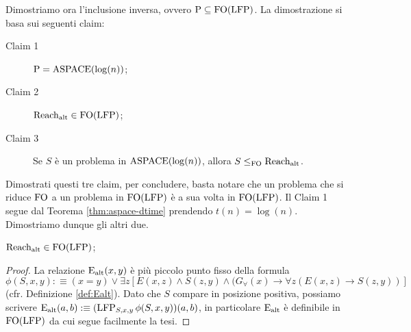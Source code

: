 Dimostriamo ora l'inclusione inversa, ovvero $\operatorname{P} \subseteq \operatorname{FO}(\operatorname{LFP})$. La
dimostrazione si basa sui seguenti claim:
\begin{description}
 \item[Claim 1]\label{p_eq_a} $\operatorname{P} = \operatorname{ASPACE}(\log(n))$;
 \item[Claim 2]\label{ralt_in_p} $\operatorname{Reach_{alt}} \in \operatorname{FO}(\operatorname{LFP})$;
 \item[Claim 3]\label{reduct_fo} Se $S$ è un problema in $\operatorname{ASPACE}(\log(n))$, allora $S \leq_{\operatorname{FO}} \operatorname{Reach_{alt}}$.
\end{description}
Dimostrati questi tre claim, per concludere, basta notare che un problema che si
riduce $\operatorname{FO}$ a un problema in $\operatorname{FO}(\operatorname{LFP})$ è a sua volta in $\operatorname{FO}(\operatorname{LFP})$.
Il Claim 1 segue dal Teorema \ref{thm:aspace-dtime} prendendo $t(n) = \log(n)$.
Dimostriamo dunque gli altri due.
\begin{proposizione}
\label{prop:ralt-in-fo(lfp)}
  $\operatorname{Reach_{alt}} \in \operatorname{FO}(\operatorname{LFP})$;
\end{proposizione}
\begin{proof}
 La relazione $\operatorname{E_{alt}}(x,y)$ è più piccolo punto fisso della formula
 \[ \phi(S,x,y) :\equiv (x=y) \lor \exists z 
  \left[ E(x,z) \land S(z,y) \land (G_\forall(x) \rightarrow \forall z\left(E(x,z) \rightarrow S(z,y)\right)\right]
 \]
 (cfr. Definizione \ref{def:Ealt}). Dato che $S$ compare in posizione positiva,
 possiamo scrivere $\operatorname{E_{alt}}(a,b) :\equiv (\operatorname{LFP}_{S,x,y} \phi(S,x,y))(a,b)$,
 in particolare $\operatorname{E_{alt}}$ è definibile in $\operatorname{FO}(\operatorname{LFP})$ da cui segue facilmente
 la tesi.
\end{proof}

